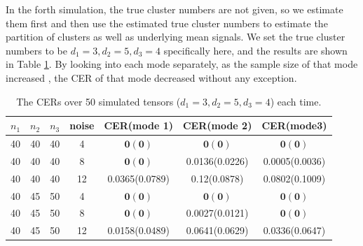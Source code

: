 \documentclass{article}
\begin{document}
In the forth simulation, the true cluster numbers are not given, so we estimate them first and then use the estimated true cluster numbers to estimate the partition of clusters as well as underlying mean signals. We set the true cluster numbers to be $d_1=3, d_2=5, d_3=4$ specifically here, and the results are shown in Table \ref{t3}. By looking into each mode separately, as the sample size of that mode increased , the CER of that mode decreased without any exception.\par  
\begin{table}
	\centering
	\begin{tabular}{|c|c|c|c|c|c|c|}
		\hline
		$n_1$&$n_2$&$n_3$&noise&CER(mode 1)&CER(mode 2)&CER(mode3)\\ \hline
		40&40&40&4&$\mathbf{0(0)}$&$\mathbf{0(0)}$&$\mathbf{0(0)}$\\
		40&40&40&8&$\mathbf{0(0)}$&0.0136(0.0226)&0.0005(0.0036) \\
		40&40&40&12&0.0365(0.0789)&0.12(0.0878)&0.0802(0.1009)\\
		40&45&50&4&$\mathbf{0(0)}$&$\mathbf{0(0)}$&$\mathbf{0(0)}$\\
		40&45&50&8&$\mathbf{0(0)}$&0.0027(0.0121)&$\mathbf{0(0)}$\\
		40&45&50&12&0.0158(0.0489)&0.0641(0.0629)&0.0336(0.0647)\\
		\hline
	\end{tabular}
	\caption{The CERs over 50 simulated tensors ($d_1=3, d_2=5, d_3=4$) each time.}
	\label{t3}
\end{table}
\end{document}
